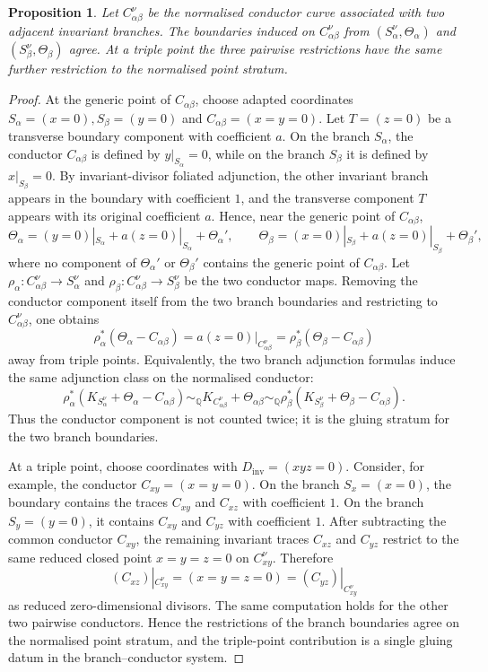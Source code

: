 \documentclass[11pt]{amsart}
\numberwithin{equation}{section}
\theoremstyle{plain}
\newtheorem{Proposition}[Theorem]{Proposition}
\theoremstyle{definition}
\newcommand{\Dinv}{D_{\mathrm{inv}}}
\begin{document}
\begin{Proposition}
\label{prop:no-double-count}
Let $C_{\alpha\beta}^\nu$ be the normalised conductor curve associated with two adjacent invariant branches.  The boundaries induced on $C_{\alpha\beta}^\nu$ from $(S_\alpha^\nu,\Theta_\alpha)$ and $(S_\beta^\nu,\Theta_\beta)$ agree.  At a triple point the three pairwise restrictions have the same further restriction to the normalised point stratum.
\end{Proposition}

\begin{proof}
At the generic point of \(C_{\alpha\beta}\), choose adapted coordinates
$
S_\alpha=(x=0), S_\beta=(y=0) $ and $ C_{\alpha\beta}=(x=y=0).
$
Let \(T=(z=0)\) be a transverse boundary component with coefficient \(a\). On the branch \(S_\alpha\), the conductor \(C_{\alpha\beta}\) is defined by \(y|_{S_\alpha}=0\), while on the branch \(S_\beta\) it is defined by \(x|_{S_\beta}=0\). By invariant-divisor foliated adjunction, the other invariant branch appears in the boundary with coefficient \(1\), and the transverse component \(T\) appears with its original coefficient \(a\). Hence, near the generic point of \(C_{\alpha\beta}\),
\[
\Theta_\alpha=(y=0)|_{S_\alpha}+a(z=0)|_{S_\alpha}+\Theta_\alpha',
\qquad
\Theta_\beta=(x=0)|_{S_\beta}+a(z=0)|_{S_\beta}+\Theta_\beta',
\]
where no component of \(\Theta_\alpha'\) or \(\Theta_\beta'\) contains the generic point of \(C_{\alpha\beta}\).
Let \(\rho_\alpha:C_{\alpha\beta}^{\nu}\to S_\alpha^\nu\) and \(\rho_\beta:C_{\alpha\beta}^{\nu}\to S_\beta^\nu\) be the two conductor maps. Removing the conductor component itself from the two branch boundaries and restricting to \(C_{\alpha\beta}^{\nu}\), one obtains
\[
\rho_\alpha^*(\Theta_\alpha-C_{\alpha\beta})
=
a(z=0)|_{C_{\alpha\beta}^{\nu}}
=
\rho_\beta^*(\Theta_\beta-C_{\alpha\beta})
\]
away from triple points. Equivalently, the two branch adjunction formulas induce the same adjunction class on the normalised conductor:
\[
\rho_\alpha^*(K_{S_\alpha^\nu}+\Theta_\alpha-C_{\alpha\beta})
\sim_{\mathbb Q}
K_{C_{\alpha\beta}^{\nu}}+\Theta_{\alpha\beta}
\sim_{\mathbb Q}
\rho_\beta^*(K_{S_\beta^\nu}+\Theta_\beta-C_{\alpha\beta}).
\]
Thus the conductor component is not counted twice; it is the gluing stratum for the two branch boundaries.

At a triple point, choose coordinates with \(\Dinv=(xyz=0)\). Consider, for example, the conductor \(C_{xy}=(x=y=0)\). On the branch \(S_x=(x=0)\), the boundary contains the traces \(C_{xy}\) and \(C_{xz}\) with coefficient \(1\). On the branch \(S_y=(y=0)\), it contains \(C_{xy}\) and \(C_{yz}\) with coefficient \(1\). After subtracting the common conductor \(C_{xy}\), the remaining invariant traces \(C_{xz}\) and \(C_{yz}\) restrict to the same reduced closed point \(x=y=z=0\) on \(C_{xy}^{\nu}\). Therefore
\[
(C_{xz})|_{C_{xy}^{\nu}}
=
(x=y=z=0)
=
(C_{yz})|_{C_{xy}^{\nu}}
\]
as reduced zero-dimensional divisors. The same computation holds for the other two pairwise conductors. Hence the restrictions of the branch boundaries agree on the normalised point stratum, and the triple-point contribution is a single gluing datum in the branch--conductor system.
\end{proof}
\end{document}
